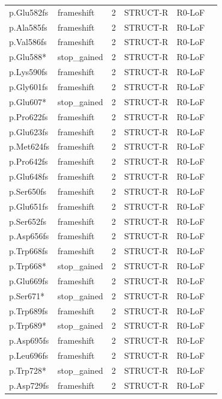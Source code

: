 \begin{footnotesize}
\begin{longtable}{llllll}
p.Glu582fs & frameshift & 2 & STRUCT-R & R0-LoF & \\
p.Ala585fs & frameshift & 2 & STRUCT-R & R0-LoF & \\
p.Val586fs & frameshift & 2 & STRUCT-R & R0-LoF & \\
p.Glu588* & stop\_gained & 2 & STRUCT-R & R0-LoF & \\
p.Lys590fs & frameshift & 2 & STRUCT-R & R0-LoF & \\
p.Gly601fs & frameshift & 2 & STRUCT-R & R0-LoF & \\
p.Glu607* & stop\_gained & 2 & STRUCT-R & R0-LoF & \\
p.Pro622fs & frameshift & 2 & STRUCT-R & R0-LoF & \\
p.Glu623fs & frameshift & 2 & STRUCT-R & R0-LoF & \\
p.Met624fs & frameshift & 2 & STRUCT-R & R0-LoF & \\
p.Pro642fs & frameshift & 2 & STRUCT-R & R0-LoF & \\
p.Glu648fs & frameshift & 2 & STRUCT-R & R0-LoF & \\
p.Ser650fs & frameshift & 2 & STRUCT-R & R0-LoF & \\
p.Glu651fs & frameshift & 2 & STRUCT-R & R0-LoF & \\
p.Ser652fs & frameshift & 2 & STRUCT-R & R0-LoF & \\
p.Asp656fs & frameshift & 2 & STRUCT-R & R0-LoF & \\
p.Trp668fs & frameshift & 2 & STRUCT-R & R0-LoF & \\
p.Trp668* & stop\_gained & 2 & STRUCT-R & R0-LoF & \\
p.Glu669fs & frameshift & 2 & STRUCT-R & R0-LoF & \\
p.Ser671* & stop\_gained & 2 & STRUCT-R & R0-LoF & \\
p.Trp689fs & frameshift & 2 & STRUCT-R & R0-LoF & \\
p.Trp689* & stop\_gained & 2 & STRUCT-R & R0-LoF & \\
p.Asp695fs & frameshift & 2 & STRUCT-R & R0-LoF & \\
p.Leu696fs & frameshift & 2 & STRUCT-R & R0-LoF & \\
p.Trp728* & stop\_gained & 2 & STRUCT-R & R0-LoF & \\
p.Asp729fs & frameshift & 2 & STRUCT-R & R0-LoF & \\
\hline
\end{longtable}
\end{footnotesize}

